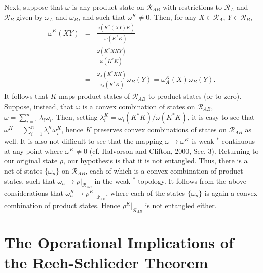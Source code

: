 \documentclass[12pt]{article}
\newcommand{\alg}[1]{\mbox{$\mathcal{#1}$}}
\begin{document}
Next, suppose that $\omega$ is any product state on 
$\alg{R}_{AB}$ with restrictions to $\alg{R}_{A}$ and 
$\alg{R}_{B}$ given by $\omega_{A}$ and $\omega_{B}$, and such that 
$\omega^{K}\not=0$.  Then, for any 
$X\in\alg{R}_{A}$, $Y\in\alg{R}_{B}$,
\begin{eqnarray}
 \omega^{K}(XY) & = & 
 \frac{\omega(K^{*}(XY)K)}{\omega(K^{*}K)} \\
 & = & \frac{\omega(K^{*}XKY)}{\omega(K^{*}K)} \\ 
 & = & \frac{\omega_{A}(K^{*}XK)}{\omega_{A}(K^{*}K)}\omega_{B}(Y)
 = \omega_{A}^{K}(X)\omega_{B}(Y).
 \end{eqnarray}
It follows that $K$ maps product states of $\alg{R}_{AB}$ to 
product states (or to zero).
Suppose, instead, that $\omega $ is a convex combination of states on 
$\alg{R}_{AB}$,
$\omega =\sum _{i=1}^{n}\lambda _{i}\omega _{i}$.  
Then, setting
$\lambda ^{K}_{i}= \omega _{i}(K^{*}K)/\omega (K^{*}K)$, it is 
easy to see that
$\omega ^{K}=\sum _{i=1}^{n}\lambda ^{K}_{i}\omega _{i}^{K}$,
hence $K$ preserves convex combinations of states on 
$\alg{R}_{AB}$ as well.  It is also not difficult to see that the mapping 
$\omega\mapsto\omega^{K}$ is weak-$^{*}$ continuous at any point where 
$\omega^{K}\not=0$  
 (cf. Halvorson and Clifton, 2000, Sec. 3).  
Returning to our original state $\rho$, our hypothesis is that it is 
 not 
entangled. Thus, there is a net 
of states 
$\{\omega_{n}\}$ on $\alg{R}_{AB}$, each of which is a convex combination of product states, 
such that 
$\omega_{n}\rightarrow \rho|_{\alg{R}_{AB}}$ in the weak-$^{*}$ 
topology.  It follows from the 
above considerations that 
$\omega_{n}^{K}\rightarrow \rho^{K}|_{\alg{R}_{AB}}$, where 
each of the states $\{\omega_{n}\}$ is again a convex combination of 
product states.  Hence $\rho^{K}|_{\alg{R}_{AB}}$ is not 
entangled either.

\section{The Operational Implications of the Reeh-Schlieder Theorem}   
       
\end{document}
